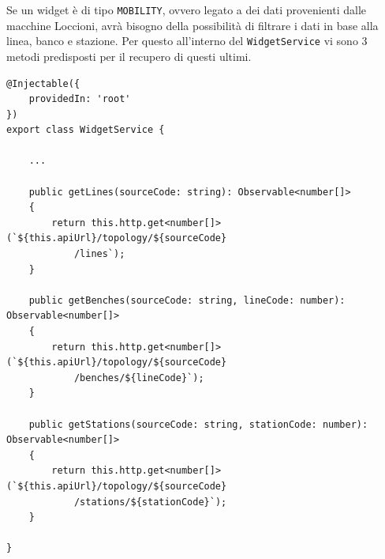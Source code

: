 Se un widget è di tipo \verb|MOBILITY|, ovvero legato a dei dati provenienti dalle macchine Loccioni, avrà bisogno della possibilità di filtrare i dati in base alla linea, banco e stazione. Per questo all'interno del \verb|WidgetService| vi sono 3 metodi predisposti per il recupero di questi ultimi.\\
\begin{lstlisting}[caption={Metodi per recuperare linee, banchi e stazioni all'interno della classe WidgetService}, style=javaScriptCode]
@Injectable({
    providedIn: 'root'
})
export class WidgetService {

    ...
        
    public getLines(sourceCode: string): Observable<number[]> 
    {
        return this.http.get<number[]>(`${this.apiUrl}/topology/${sourceCode}
            /lines`);
    }

    public getBenches(sourceCode: string, lineCode: number): Observable<number[]> 
    {
        return this.http.get<number[]>(`${this.apiUrl}/topology/${sourceCode}
            /benches/${lineCode}`);
    }

    public getStations(sourceCode: string, stationCode: number): Observable<number[]> 
    {
        return this.http.get<number[]>(`${this.apiUrl}/topology/${sourceCode}
            /stations/${stationCode}`);
    }

}
\end{lstlisting}

